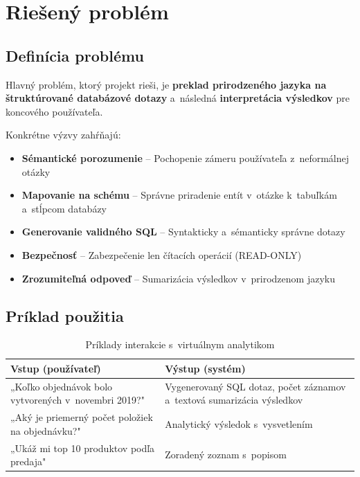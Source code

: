 \documentclass[a4paper, 12pt]{article}
\begin{document}
\clearpage

\section{Riešený problém}

\subsection{Definícia problému}

Hlavný problém, ktorý projekt rieši, je \textbf{preklad prirodzeného jazyka na štruktúrované databázové dotazy} a~následná \textbf{interpretácia výsledkov} pre koncového používateľa.

Konkrétne výzvy zahŕňajú:
\begin{itemize}
    \item \textbf{Sémantické porozumenie} -- Pochopenie zámeru používateľa z~neformálnej otázky
    \item \textbf{Mapovanie na schému} -- Správne priradenie entít v~otázke k~tabuľkám a~stĺpcom databázy
    \item \textbf{Generovanie validného SQL} -- Syntakticky a~sémanticky správne dotazy
    \item \textbf{Bezpečnosť} -- Zabezpečenie len čítacích operácií (READ-ONLY)
    \item \textbf{Zrozumiteľná odpoveď} -- Sumarizácia výsledkov v~prirodzenom jazyku
\end{itemize}

\subsection{Príklad použitia}

\begin{table}[H]
\centering
\begin{tabular}{p{6cm}p{8cm}}
\toprule
\textbf{Vstup (používateľ)} & \textbf{Výstup (systém)} \\
\midrule
„Koľko objednávok bolo vytvorených v~novembri 2019?" & Vygenerovaný SQL dotaz, počet záznamov a~textová sumarizácia výsledkov \\
\midrule
„Aký je priemerný počet položiek na objednávku?" & Analytický výsledok s~vysvetlením \\
\midrule
„Ukáž mi top 10 produktov podľa predaja" & Zoradený zoznam s~popisom \\
\bottomrule
\end{tabular}
\caption{Príklady interakcie s~virtuálnym analytikom}
\end{table}
\end{document}
